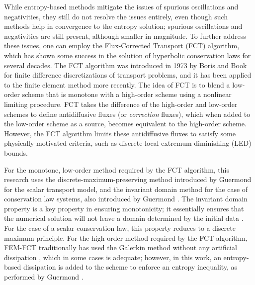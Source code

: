 While entropy-based methods mitigate the issues of spurious oscillations
and negativities, they still do not resolve the issues entirely, even
though such methods help in convergence to the entropy solution; spurious
oscillations and negativities are still present, although smaller in
magnitude. To further address these issues, one can employ the Flux-Corrected Transport (FCT)
algorithm, which has shown some success in the solution of hyperbolic
conservation laws for several decades.
The FCT algorithm was introduced in 1973 by Boris and Book\cite{borisbook} for
finite difference discretizations of transport problems, and it has
been applied to the finite element method more recently. The idea of FCT
is to blend a low-order scheme that is monotone with a high-order
scheme using a nonlinear limiting procedure. FCT takes the difference
of the high-order and low-order schemes to define antidiffusive
fluxes (or \emph{correction} fluxes), which when added to the low-order
scheme as a source, becomes equivalent to the high-order scheme. However,
the FCT algorithm limits these antidiffusive fluxes to satisfy some
physically-motivated criteria, such as discrete local-extremum-diminishing
(LED) bounds.

For the monotone, low-order method required by the FCT algorithm, this research
uses the discrete-maximum-preserving method introduced by Guermond
\cite{guermond_firstorder} for the scalar transport model, and the invariant
domain method for the case of conservation law systems,
also introduced by Guermond \cite{guermond_invariantdomain}.
The invariant domain property is a key
property in ensuring monotonicity; it essentially ensures that the numerical
solution will not leave a domain determined by the initial data \cite{hoff_1985}.
For the case of a scalar conservation law, this property reduces to a discrete
maximum principle.
For the high-order method required by the FCT algorithm, FEM-FCT traditionally
has used the Galerkin method without any artificial dissipation \cite{kuzmin_FCT},
which in some cases is adequate; however, in
this work, an entropy-based dissipation is added to the scheme to enforce
an entropy inequality, as performed by Guermond
\cite{guermond_ev}\cite{guermond_secondorder}.

